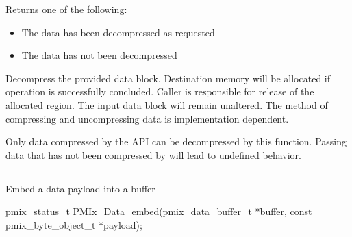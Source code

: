 \begin{arglist}
\end{arglist}

Returns one of the following:
\begin{itemize}
\item {} The data has been decompressed as requested
\item {} The data has not been decompressed
\end{itemize}

\descr

Decompress the provided data block. Destination memory
will be allocated if operation is successfully concluded. Caller
is responsible for release of the allocated region. The input
data block will remain unaltered.
The method of compressing and uncompressing data is implementation dependent. 

Only data compressed by the  \ac{API}
can be decompressed by this function. Passing data that has not
been compressed by  will lead to
undefined behavior.


\subsection{}

\summary

Embed a data payload into a buffer

\format

\cspecificstart
\begin{codepar}
pmix_status_t
PMIx_Data_embed(pmix_data_buffer_t *buffer,
                const pmix_byte_object_t *payload);
\end{codepar}
\cspecificend

\begin{arglist}
\end{arglist}


